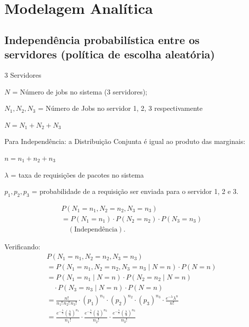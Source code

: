 \documentclass[conference]{IEEE_Conference_Template/IEEEtran}
\begin{document}
\section{Modelagem Analítica}

\subsection{Independência probabilística entre os servidores (política de escolha aleatória)}

3 Servidores

$N$ = Número de jobs no sistema (3 servidores);

$N_1, N_2, N_3$ = Número de Jobs no servidor 1, 2, 3 respectivamente

$N = N_1 + N_2 + N_3$

Para Independência: a Distribuição Conjunta é igual ao produto das marginais:

$n = n_1 + n_2 + n_3$

$\lambda$ = taxa de requisições de pacotes no sistema

$p_1, p_2, p_3$ = probabilidade de a requisição ser enviada para o servidor 1, 2 e 3.

\begin{align}
&P(N_1 = n_1, N_2 = n_2, N_3 = n_3) \nonumber\\
&= P(N_1 = n_1) \cdot P(N_2 = n_2) \cdot P(N_3 = n_3) \nonumber\\
&\quad (\text{Independência}).
\end{align}

Verificando:
\begin{align}
&P(N_1 = n_1, N_2 = n_2, N_3 = n_3) \nonumber\\
&= P(N_1 = n_1, N_2 = n_2, N_3 = n_3 \mid N = n) \cdot P(N = n) \nonumber\\
&= P(N_1 = n_1 \mid N = n) \cdot P(N_2 = n_2 \mid N = n) \nonumber\\
&\quad \cdot P(N_3 = n_3 \mid N = n) \cdot P(N = n) \nonumber\\
&= \frac{n!}{n_1! \, n_2! \, n_3!} \cdot (p_1)^{n_1} \cdot (p_2)^{n_2} \cdot (p_3)^{n_3} \cdot \frac{e^{-\lambda} \lambda^n}{n!} \nonumber\\
&= \frac{e^{-\frac{\lambda}{3}} \left(\frac{\lambda}{3}\right)^{n_1}}{n_1!} \cdot \frac{e^{-\frac{\lambda}{3}} \left(\frac{\lambda}{3}\right)^{n_2}}{n_2!} \cdot \frac{e^{-\frac{\lambda}{3}} \left(\frac{\lambda}{3}\right)^{n_3}}{n_3!}
\end{align}
\end{document}
